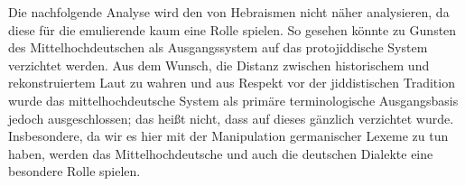  Die nachfolgende Analyse wird den  von Hebraismen nicht näher analysieren, da diese für die emulierende  kaum eine Rolle spielen. So gesehen könnte zu Gunsten des Mittelhochdeutschen als Ausgangssystem auf das protojiddische System verzichtet werden. Aus dem Wunsch, die Distanz zwischen historischem und rekonstruiertem Laut zu wahren und aus Respekt vor der jiddistischen Tradition wurde das mittelhochdeutsche System als primäre terminologische Ausgangsbasis jedoch ausgeschlossen; das heißt nicht, dass auf dieses gänzlich verzichtet wurde. Insbesondere, da wir es hier mit der Manipulation germanischer Lexeme zu tun haben, werden das Mittelhochdeutsche und auch die deutschen Dialekte eine besondere Rolle spielen. \\



